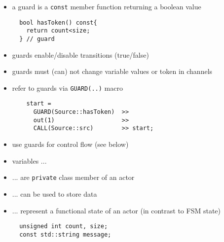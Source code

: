 \begin{frame}[fragile=singleslide]
\begin{itemize}
\item a guard is a \lstinline!const! member function returning a boolean value
\begin{lstlisting}
  bool hasToken() const{
    return count<size;
  } // guard
\end{lstlisting}
\item guards enable/disable transitions (true/false)
\item guards must (can) not change variable values or token in channels
\item refer to guards via \lstinline!GUARD(..)! macro 
\begin{lstlisting}
    start = 
      GUARD(Source::hasToken)  >>
      out(1)                   >>
      CALL(Source::src)        >> start;
\end{lstlisting}
\item use guards for control flow (see below)
\end{itemize}
\end{frame}







\begin{frame}[fragile=singleslide]
\begin{itemize}
\item variables ...
\item ... are \lstinline!private! class member of an actor
\item ... can be used to store data
\item ... represent a functional state of an actor (in contrast to FSM state)
\begin{lstlisting}
  unsigned int count, size;
  const std::string message;
\end{lstlisting}
\end{itemize}
\end{frame}






